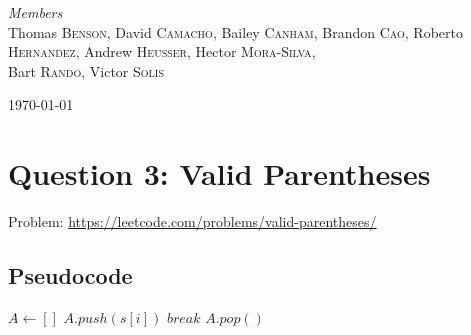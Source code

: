 \begin{titlepage}


	{\large\textit{Members}}\\
	Thomas \textsc{Benson}, %
	David \textsc{Camacho}, %
	Bailey \textsc{Canham}, %
	Brandon \textsc{Cao}, %
	Roberto \textsc{Hernandez}, %
	Andrew \textsc{Heusser}, %
    Hector \textsc{Mora-Silva},\\ %
	Bart \textsc{Rando}, %
	Victor \textsc{Solis} %


	\vfill\vfill\vfill %

	{\large\today} %


	\vfill %

\end{titlepage}


\section*{Question 3: Valid Parentheses}
Problem: \url{https://leetcode.com/problems/valid-parentheses/}

\subsection*{Pseudocode}
    \begin{algorithmic}
            \State $A \gets []$
                \If{$s[i] = ($ \textbf{or} $s[i] = [$ \textbf{or} $s[i] = \{$}
                    \State $A.push(s[i])$
                \ElsIf{$s[i] = )$ or $s[i] = ]$ or $s[i] = \}$}
                    \If{$A.top \neq ($ \textbf{or} $A.top \neq [$ \textbf{or} $A.top \neq \{$}
                        \State $break$
                    \Else
                        \State $A.pop()$
                    \EndIf
                \EndIf
            \EndFor

            \Else {}
            \EndIf
        \EndFunction
    \end{algorithmic}

